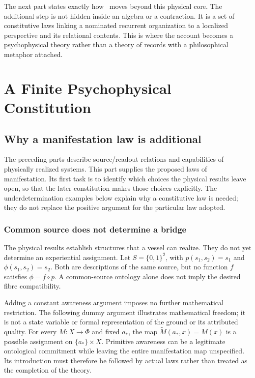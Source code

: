 The next part states exactly how \spctwo\ moves beyond this physical core. The additional step is not hidden inside an algebra or a contraction. It is a set of constitutive laws linking a nominated recurrent organization to a localized perspective and its relational contents. This is where the account becomes a psychophysical theory rather than a theory of records with a philosophical metaphor attached.


\part{A Finite Psychophysical Constitution}\label{part:constitution}
\begingroup
\setlength{\parskip}{0pt}
\chapter{Why a manifestation law is additional}\label{ch:underdetermination}
The preceding parts describe source/readout relations and capabilities of physically realized systems. This part supplies the proposed laws of manifestation. Its first task is to identify which choices the physical results leave open, so that the later constitution makes those choices explicitly. The underdetermination examples below explain why a constitutive law is needed; they do not replace the positive argument for the particular law adopted.

\section{Common source does not determine a bridge}\label{section:underdetermination:common-source-does-not-determine-a-bridge}
The physical results establish structures that a vessel can realize. They do not yet determine an experiential assignment. Let $S=\{0,1\}^2$, with $p(s_1,s_2)=s_1$ and $\phi(s_1,s_2)=s_2$. Both are descriptions of the same source, but no function $f$ satisfies $\phi=f\circ p$. A common-source ontology alone does not imply the desired fibre compatibility.

Adding a constant awareness argument imposes no further mathematical restriction. The following dummy argument illustrates mathematical freedom; it is not a state variable or formal representation of the ground or its attributed quality. For every $M:X\to\Phi$ and fixed $a_*$, the map $\widetilde M(a_*,x)=M(x)$ is a possible assignment on $\{a_*\}\times X$. Primitive awareness can be a legitimate ontological commitment while leaving the entire manifestation map unspecified. Its introduction must therefore be followed by actual laws rather than treated as the completion of the theory.

